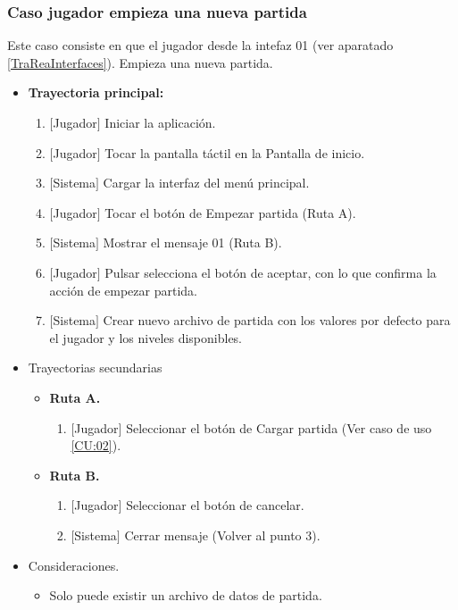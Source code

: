 	 \subsubsection{Caso jugador empieza una nueva partida}\label{CasoEmpezar}
	 Este caso consiste en que el jugador desde la intefaz 01 (ver aparatado
	  \ref{TraReaInterfaces}). Empieza una nueva partida.  
	\begin{itemize}
		\item \textbf{Trayectoria principal:}
			\begin{enumerate}
				\item $\lbrack$Jugador$\rbrack$ Iniciar la aplicación.
				\item $\lbrack$Jugador$\rbrack$ Tocar la pantalla táctil en la Pantalla de 
				inicio.
				\item $\lbrack$Sistema$\rbrack$ Cargar la interfaz del menú principal.
				\item $\lbrack$Jugador$\rbrack$ Tocar el botón de Empezar partida (Ruta A).
				\item $\lbrack$Sistema$\rbrack$ Mostrar el mensaje 01 (Ruta B).
				\item $\lbrack$Jugador$\rbrack$ Pulsar selecciona el botón de aceptar, con 
				lo que confirma la acción de empezar partida.
				\item $\lbrack$Sistema$\rbrack$ Crear nuevo archivo de partida con los valores 
				por defecto para el jugador y los niveles disponibles.
			\end{enumerate}
		\item Trayectorias secundarias
			\begin{itemize}
				\item \textbf{Ruta A.}
					\begin{enumerate}[{A.}1]
						\item $\lbrack$Jugador$\rbrack$ Seleccionar el botón de Cargar partida 
						(Ver caso de uso \ref{CU:02}).
					\end{enumerate}
				\item \textbf{Ruta B.}
					\begin{enumerate}[{B.}1]
						\item $\lbrack$Jugador$\rbrack$ Seleccionar el botón de cancelar.
						\item $\lbrack$Sistema$\rbrack$ Cerrar mensaje (Volver al punto 3). 
					\end{enumerate}
			\end{itemize}
		\item Consideraciones.
			\begin{itemize}
				\item Solo puede existir un archivo de datos de partida.
			\end{itemize}
	\end{itemize}